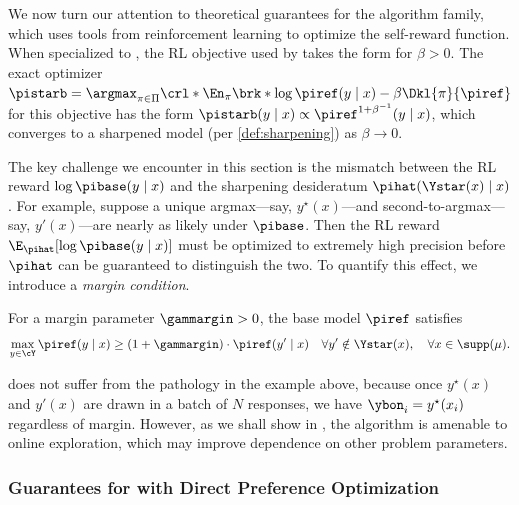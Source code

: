 
We now turn our attention to theoretical guarantees for the \rlhfalg
algorithm family, which uses tools from reinforcement learning to optimize
the self-reward function. When specialized to \mlsharp, the  RL
objective used by \rlhfalg takes the form 
for $\beta>0$. The exact optimizer $\pistarb = \argmax_{\pi\in\Pi}\crl*{
  \En_{\pi}\brk*{\log\piref(y\mid{}x)}
  -\beta\Dkl{\pi}{\piref}
}$ for this objective has the form $
\pistarb(y\mid{}x)\propto\piref^{1+\beta^{-1}}(y\mid{}x)$,  which converges to a sharpened model (per \cref{def:sharpening}) as $\beta\to{}0$.\loose


The key challenge we encounter in this section is the mismatch between the RL reward $\log \pibase(y \mid x)$ and the sharpening desideratum $\pihat(\Ystar(x) \mid x)$. For example, suppose a unique argmax---say, $y^\star(x)$---and second-to-argmax---say, $y'(x)$---are nearly as likely under $\pibase$. Then the RL reward $\E_{\pihat}[\log \pibase(y \mid x)]$ must be optimized to extremely high precision before $\pihat$ can be guaranteed to distinguish the two. To quantify this effect, we introduce a 
\emph{margin condition}. 
\begin{assumption}[Margin]
  \label{ass:hard_margin}
  For a margin parameter $\gammargin>0$, the base model $\piref$ satisfies
  \[
    \max_{y\in\cY}\piref(y\mid{}x) \geq{}(1+\gammargin)\cdot\piref(y'\mid{}x)\quad\forall{}y'\notin\Ystar(x),\quad\forall{}x\in\supp(\mu).
  \]%
  \iclr{\vspace{-5pt}}
\end{assumption}
\sftalg does not suffer from the pathology in the example above, because once $y^\star(x)$ and $y'(x)$ are drawn in a batch of $N$ responses, we have $\ybon_i = y^\star(x_i)$ regardless of margin. However, as we shall show in , the \rlhfalg algorithm is amenable to online exploration, which may improve dependence on other problem parameters.




\subsubsection{Guarantees for \rlhfalg with Direct Preference Optimization}

